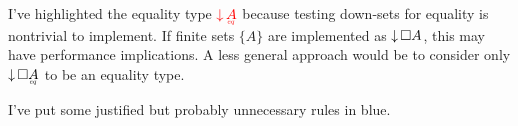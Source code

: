 \documentclass{article}
\begin{document}
I've highlighted the equality type ${\color{red} \Down{\eq{A}}}$ because testing
down-sets for equality is nontrivial to implement. If finite sets $\{A\}$ are
implemented as ${\downarrow}\,{\square{A}}$, this may have performance implications. A less
general approach would be to consider only $\Down{\Disc{\eq{A}}}$ to be an
equality type.

I've put some justified but probably unnecessary rules in {\color{blue} blue}.















\end{document}
